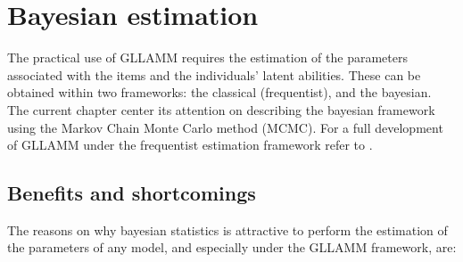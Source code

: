 \chapter{Bayesian estimation} \label{chap:estimation}

The practical use of GLLAMM requires the estimation of the parameters associated with the items and the individuals' latent abilities. These can be obtained within two frameworks: the classical (frequentist), and the bayesian. The current chapter center its attention on describing the bayesian framework using the Markov Chain Monte Carlo method (MCMC). For a full development of GLLAMM under the frequentist estimation framework refer to \citet{Rabe_et_al_2004a, Rabe_et_al_2004b, Skrondal_et_al_2004a, Rabe_et_al_2012}.


\section{Benefits and shortcomings}

The reasons on why bayesian statistics is attractive to perform the estimation of the parameters of any model, and especially under the GLLAMM framework, are:

